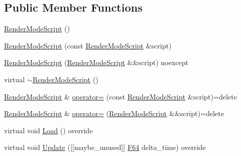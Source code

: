\subsection*{Public Member Functions}
\begin{DoxyCompactItemize}
\item 
\hyperlink{classmage_1_1script_1_1_render_mode_script_a3b0f9d1939b43f2d119124e1324a9f96}{Render\+Mode\+Script} ()
\item 
\hyperlink{classmage_1_1script_1_1_render_mode_script_a37def9fab4b7cdcbe17b583de5ee7c2b}{Render\+Mode\+Script} (const \hyperlink{classmage_1_1script_1_1_render_mode_script}{Render\+Mode\+Script} \&script)
\item 
\hyperlink{classmage_1_1script_1_1_render_mode_script_ae263d571d5ce837972b4addabe37151e}{Render\+Mode\+Script} (\hyperlink{classmage_1_1script_1_1_render_mode_script}{Render\+Mode\+Script} \&\&script) noexcept
\item 
virtual \hyperlink{classmage_1_1script_1_1_render_mode_script_adef264fb8660a5e8d2504fdfa07252e5}{$\sim$\+Render\+Mode\+Script} ()
\item 
\hyperlink{classmage_1_1script_1_1_render_mode_script}{Render\+Mode\+Script} \& \hyperlink{classmage_1_1script_1_1_render_mode_script_af735235c25858295c4e5e23586b19f20}{operator=} (const \hyperlink{classmage_1_1script_1_1_render_mode_script}{Render\+Mode\+Script} \&script)=delete
\item 
\hyperlink{classmage_1_1script_1_1_render_mode_script}{Render\+Mode\+Script} \& \hyperlink{classmage_1_1script_1_1_render_mode_script_a75affa0757f3ad8603d6437e48732ab4}{operator=} (\hyperlink{classmage_1_1script_1_1_render_mode_script}{Render\+Mode\+Script} \&\&script)=delete
\item 
virtual void \hyperlink{classmage_1_1script_1_1_render_mode_script_ab116aa499231f34dbc61b69e121e2e49}{Load} () override
\item 
virtual void \hyperlink{classmage_1_1script_1_1_render_mode_script_afe0bfc54c414c2697dfd2babaccf3b51}{Update} (\mbox{[}\mbox{[}maybe\+\_\+unused\mbox{]}\mbox{]} \hyperlink{namespacemage_ad26233bbec640deda836e572c1a23708}{F64} delta\+\_\+time) override
\end{DoxyCompactItemize}

